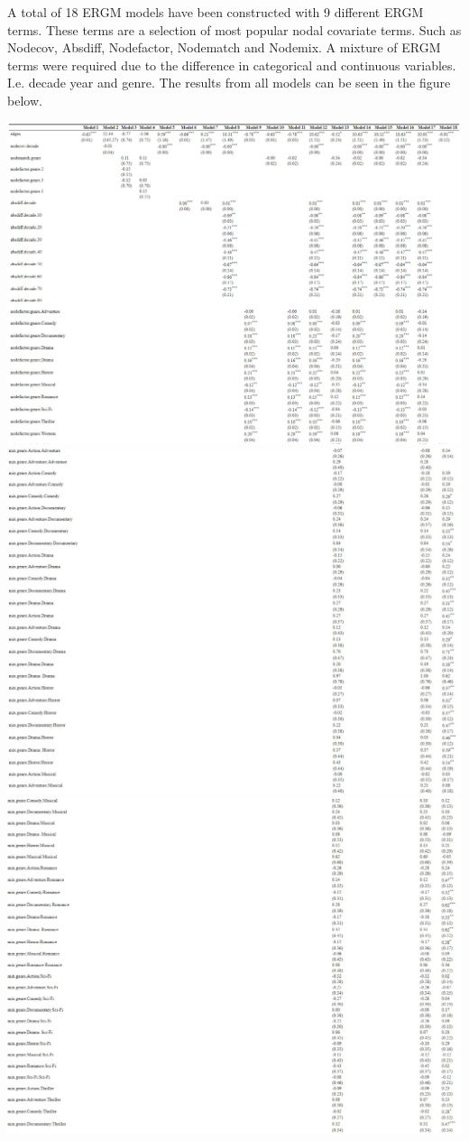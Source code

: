 \documentclass[
  english,
  man,floatsintext]{apa6}
\begin{document}
A total of 18 ERGM models have been constructed with 9 different ERGM terms. These terms are a selection of most popular nodal covariate terms. Such as Nodecov, Absdiff, Nodefactor, Nodematch and Nodemix. A mixture of ERGM terms were required due to the difference in categorical and continuous variables. I.e. decade year and genre. The results from all models can be seen in the figure below.

\includegraphics{ergm_result/model_result1.jpeg}
\includegraphics{ergm_result/model_result2.jpeg}
\includegraphics{ergm_result/model_result3.jpeg}
\end{document}
